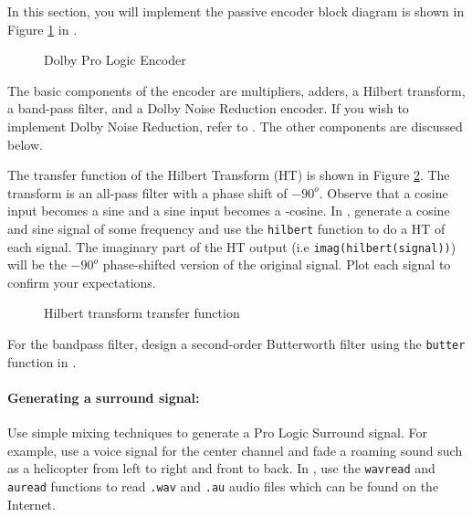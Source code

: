 
%
%
%
%
%

In this section, you will implement the passive
encoder block diagram is shown in Figure \ref{fig:encoder} in \matlab.

\begin{figure}[htb]
    \begin{center}
	\vspace*{0.5cm}
	\caption{Dolby Pro Logic Encoder}
	\label{fig:encoder}
    \end{center}
\end{figure}

The basic components of the encoder are multipliers, adders, a
Hilbert transform, a band-pass filter, and a Dolby Noise
Reduction encoder.  If you wish to implement Dolby Noise
Reduction, refer to \cite{Gundry}.  The other components are
discussed below.

The transfer function of the Hilbert Transform (HT) is shown in Figure
\ref{fig:hilbert}.  The transform is an all-pass filter with
a phase shift of $-90^{o}$.  Observe that a cosine input
becomes a sine and a sine input becomes a -cosine.  In \matlab,
generate a cosine and sine signal of some frequency and use the
\verb+hilbert+ function to do a HT of each signal.  The
imaginary part of the HT output (i.e \verb+imag(hilbert(signal))+)
will be the $-90^{o}$ phase-shifted version of the original signal.
Plot each signal to confirm your expectations.

\begin{figure}[htb]
    \begin{center}
	\vspace*{0.5cm}
	\caption{Hilbert transform transfer function}
	\label{fig:hilbert}
    \end{center}
\end{figure}

For the bandpass filter, design a second-order Butterworth filter
using the \verb+butter+ function in \matlab.

\paragraph{Generating a surround signal:}  Use simple mixing
techniques to generate a Pro Logic Surround signal.  For example,
use a voice signal for the center channel and fade a roaming sound
such as a helicopter from left to right and front to back.  In
\matlab, use the \verb+wavread+ and \verb+auread+ functions to
read \verb+.wav+ and \verb+.au+ audio files which can be found
on the Internet.


